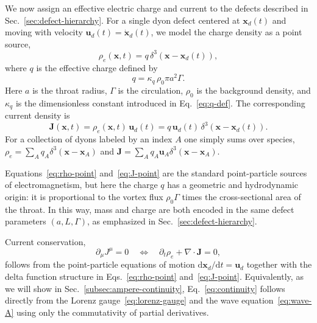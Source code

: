 \documentclass[11pt]{article}
\newcommand{\dd}{\mathrm{d}}
\begin{document}
We now assign an effective electric charge and current to the defects described in Sec.~\ref{sec:defect-hierarchy}.  For a single dyon defect centered at $\mathbf{x}_d(t)$ and moving with velocity $\mathbf{u}_d(t) = \dot{\mathbf{x}}_d(t)$, we model the charge density as a point source,
\begin{equation}
\rho_e(\mathbf{x},t)
= q\,\delta^3(\mathbf{x}-\mathbf{x}_d(t)),
\label{eq:rho-point}
\end{equation}
where $q$ is the effective charge defined by
\begin{equation}
q = \kappa_q\,\rho_0 \pi a^2 \Gamma.
\end{equation}
Here $a$ is the throat radius, $\Gamma$ is the circulation, $\rho_0$ is the background density, and $\kappa_q$ is the dimensionless constant introduced in Eq.~\eqref{eq:q-def}.  The corresponding current density is
\begin{equation}
\mathbf{J}(\mathbf{x},t)
= \rho_e(\mathbf{x},t)\,\mathbf{u}_d(t)
= q\,\mathbf{u}_d(t)\,\delta^3(\mathbf{x}-\mathbf{x}_d(t)).
\label{eq:J-point}
\end{equation}
For a collection of dyons labeled by an index $A$ one simply sums over species, $\rho_e = \sum_A q_A \delta^3(\mathbf{x}-\mathbf{x}_A)$ and $\mathbf{J} = \sum_A q_A \mathbf{u}_A \delta^3(\mathbf{x}-\mathbf{x}_A)$.

Equations~\eqref{eq:rho-point} and~\eqref{eq:J-point} are the standard point-particle sources of electromagnetism, but here the charge $q$ has a geometric and hydrodynamic origin: it is proportional to the vortex flux $\rho_0 \Gamma$ times the cross-sectional area of the throat.  In this way, mass and charge are both encoded in the same defect parameters $(a,L,\Gamma)$, as emphasized in Sec.~\ref{sec:defect-hierarchy}.

Current conservation,
\begin{equation}
\partial_\mu J^\mu = 0
\quad\Longleftrightarrow\quad
\partial_t \rho_e + \nabla\cdot\mathbf{J} = 0,
\label{eq:continuity}
\end{equation}
follows from the point-particle equations of motion $\dd\mathbf{x}_d/\dd t = \mathbf{u}_d$ together with the delta function structure in Eqs.~\eqref{eq:rho-point} and~\eqref{eq:J-point}.  Equivalently, as we will show in Sec.~\ref{subsec:ampere-continuity}, Eq.~\eqref{eq:continuity} follows directly from the Lorenz gauge~\eqref{eq:lorenz-gauge} and the wave equation~\eqref{eq:wave-A} using only the commutativity of partial derivatives.
\end{document}
